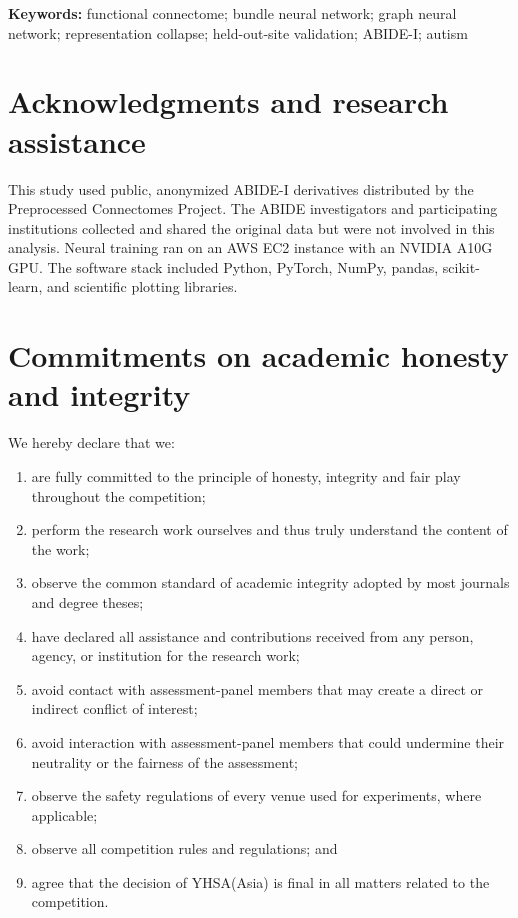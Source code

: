 \documentclass[11pt,a4paper]{article}
\begin{document}
\noindent\textbf{Keywords:} functional connectome; bundle neural network;
graph neural network; representation collapse; held-out-site validation;
ABIDE-I; autism

\clearpage
\section*{Acknowledgments and research assistance}

This study used public, anonymized ABIDE-I derivatives distributed by the
Preprocessed Connectomes Project. The ABIDE investigators and participating
institutions collected and shared the original data but were not involved in
this analysis. Neural training ran on an AWS EC2 instance with an NVIDIA A10G
GPU. The software stack included Python, PyTorch, NumPy, pandas, scikit-learn,
and scientific plotting libraries.

\clearpage
\section*{Commitments on academic honesty and integrity}

\small
We hereby declare that we:
\begin{enumerate}[label=\arabic*.,leftmargin=2.2em]
  \item are fully committed to the principle of honesty, integrity and fair
  play throughout the competition;
  \item perform the research work ourselves and thus truly understand the
  content of the work;
  \item observe the common standard of academic integrity adopted by most
  journals and degree theses;
  \item have declared all assistance and contributions received from any
  person, agency, or institution for the research work;
  \item avoid contact with assessment-panel members that may create a direct or
  indirect conflict of interest;
  \item avoid interaction with assessment-panel members that could undermine
  their neutrality or the fairness of the assessment;
  \item observe the safety regulations of every venue used for experiments,
  where applicable;
  \item observe all competition rules and regulations; and
  \item agree that the decision of YHSA(Asia) is final in all matters related
  to the competition.
\end{enumerate}
\end{document}
